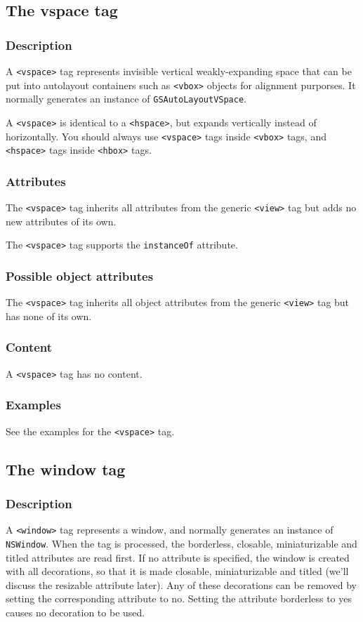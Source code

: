 \subsection{The vspace tag}

\subsubsection{Description}

A \texttt{<vspace>} tag represents invisible vertical weakly-expanding
space that can be put into autolayout containers such as
\texttt{<vbox>} objects for alignment purporses.  It normally
generates an instance of \texttt{GSAutoLayoutVSpace}.

A \texttt{<vspace>} is identical to a \texttt{<hspace>}, but expands
vertically instead of horizontally.  You should always use
\texttt{<vspace>} tags inside \texttt{<vbox>} tags, and
\texttt{<hspace>} tags inside \texttt{<hbox>} tags.

\subsubsection{Attributes}
The \texttt{<vspace>} tag inherits all attributes from the generic
\texttt{<view>} tag but adds no new attributes of its own.

The \texttt{<vspace>} tag supports the \texttt{instanceOf} attribute.

\subsubsection{Possible object attributes}
The \texttt{<vspace>} tag inherits all object attributes from the
generic \texttt{<view>} tag but has none of its own.

\subsubsection{Content}
A \texttt{<vspace>} tag has no content.

\subsubsection{Examples}
See the examples for the \texttt{<vspace>} tag.

\subsection{The window tag}
\subsubsection{Description}
A \texttt{<window>} tag represents a window, and normally generates an
instance of \texttt{NSWindow}.  When the tag is processed, the
borderless, closable, miniaturizable and titled attributes are read
first.  If no attribute is specified, the window is created with all
decorations, so that it is made closable, miniaturizable and titled
(we'll discuss the resizable attribute later).  Any of these
decorations can be removed by setting the corresponding attribute to
no.  Setting the attribute borderless to yes causes no decoration to
be used.


